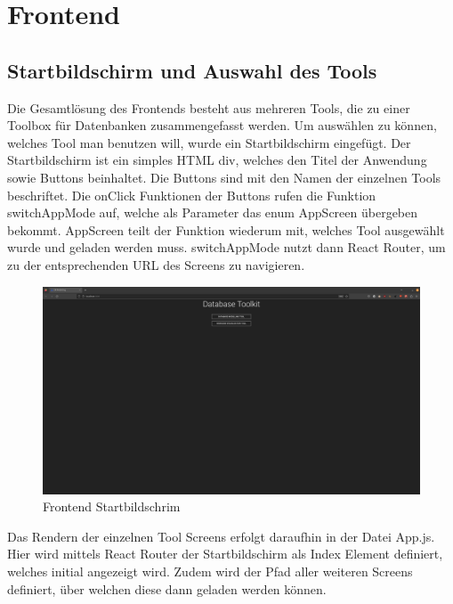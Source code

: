 \section{Frontend}
\label{sec:frontend}

\subsection{Startbildschirm und Auswahl des Tools}
\label{sub:fe_startbildschirm}

Die Gesamtlösung des Frontends besteht aus mehreren Tools, die zu einer Toolbox für Datenbanken zusammengefasst werden.
Um auswählen zu können, welches Tool man benutzen will, wurde ein Startbildschirm eingefügt.
Der Startbildschirm ist ein simples HTML div, welches den Titel der Anwendung sowie Buttons beinhaltet.
Die Buttons sind mit den Namen der einzelnen Tools beschriftet.
Die onClick Funktionen der Buttons rufen die Funktion switchAppMode auf, welche als Parameter das enum AppScreen übergeben bekommt.
AppScreen teilt der Funktion wiederum mit, welches Tool ausgewählt wurde und geladen werden muss.
switchAppMode nutzt dann React Router, um zu der entsprechenden URL des Screens zu navigieren.

\begin{figure}[H]
    \includegraphics[width=\textwidth]{images/frontend_titlescreen}
    \caption{Frontend Startbildschrim}
    \label{fig:frontend_titlescreen}
\end{figure}

Das Rendern der einzelnen Tool Screens erfolgt daraufhin in der Datei App.js.
Hier wird mittels React Router der Startbildschirm als Index Element definiert, welches initial angezeigt wird.
Zudem wird der Pfad aller weiteren Screens definiert, über welchen diese dann geladen werden können.

